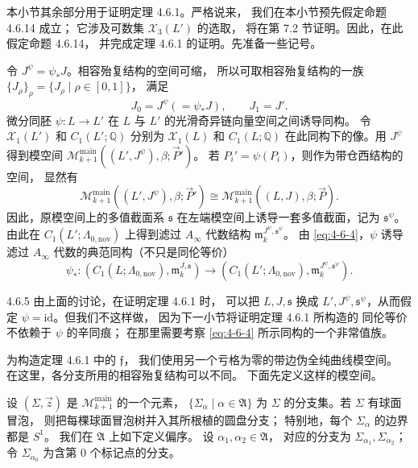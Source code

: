 本小节其余部分用于证明定理 4.6.1。严格说来，
我们在本小节预先假定命题 4.6.14 成立；
它涉及可数集 $\mathcal X_3(L')$ 的选取，
将在第 7.2 节证明。因此，在此假定命题 4.6.14，
并完成定理 4.6.1 的证明。先准备一些记号。

令 $J^\psi=\psi_*J$。相容殆复结构的空间可缩，
所以可取相容殆复结构的一族
$\{J_\rho\}_\rho=\{J_\rho\mid\rho\in[0,1]\}$，
满足
\[
 J_0=J^\psi(=\psi_*J),\qquad J_1=J'.
\]
微分同胚 $\psi\colon L\to L'$ 在 $L$ 与 $L'$
的光滑奇异链向量空间之间诱导同构。
令 $\mathcal X_1(L')$ 和 $C_1(L';\mathbb Q)$
分别为 $\mathcal X_1(L)$ 和 $C_1(L;\mathbb Q)$
在此同构下的像。用 $J^\psi$ 得到模空间
$\mathcal M_{k+1}^{\mathrm{main}}
((L',J^\psi),\beta;\vec P')$。
若 $P_i'=\psi(P_i)$，则作为带仓西结构的空间，
显然有
\begin{equation}
 \mathcal M_{k+1}^{\mathrm{main}}
 ((L',J^\psi),\beta;\vec P')
 \cong
 \mathcal M_{k+1}^{\mathrm{main}}
 ((L,J),\beta;\vec P).
\tag{4.6.4}\label{eq:4-6-4}
\end{equation}
因此，原模空间上的多值截面系 $\mathfrak s$
在左端模空间上诱导一套多值截面，记为
$\mathfrak s^\psi$。由此在
$C_1(L';\Lambda_{0,\mathrm{nov}})$
上得到滤过 $A_\infty$ 代数结构
$\mathfrak m_k^{J^\psi,\mathfrak s^\psi}$。
由 \eqref{eq:4-6-4}，$\psi$ 诱导滤过
$A_\infty$ 代数的典范同构（不只是同伦等价）
\[
 \psi_*\colon
 (C_1(L;\Lambda_{0,\mathrm{nov}}),
  \mathfrak m_k^{J,\mathfrak s})
 \longrightarrow
 (C_1(L';\Lambda_{0,\mathrm{nov}}),
  \mathfrak m_k^{J^\psi,\mathfrak s^\psi}).
\]

\begin{remark}{4.6.5}\label{rem:4-6-5}
由上面的讨论，在证明定理 4.6.1 时，
可以把 $L,J,\mathfrak s$ 换成
$L',J^\psi,\mathfrak s^\psi$，从而假定
$\psi=\mathrm{id}$。但我们不这样做，
因为下一小节将证明定理 4.6.1 所构造的
同伦等价不依赖于 $\psi$ 的辛同痕；
在那里需要考察 \eqref{eq:4-6-4}
所示同构的一个非常值族。
\end{remark}

为构造定理 4.6.1 中的 $\mathfrak f$，
我们使用另一个亏格为零的带边伪全纯曲线模空间。
在这里，各分支所用的相容殆复结构可以不同。
下面先定义这样的模空间。

设 $(\Sigma,\vec z)$ 是
$\mathcal M_{k+1}^{\mathrm{main}}$ 的一个元素，
$\{\Sigma_\alpha\mid\alpha\in\mathfrak A\}$
为 $\Sigma$ 的分支集。若 $\Sigma$ 有球面冒泡，
则把每棵球面冒泡树并入其所根植的圆盘分支；
特别地，每个 $\Sigma_\alpha$ 的边界都是 $S^1$。
我们在 $\mathfrak A$ 上如下定义偏序。
设 $\alpha_1,\alpha_2\in\mathfrak A$，
对应的分支为 $\Sigma_{\alpha_1},\Sigma_{\alpha_2}$；
令 $\Sigma_{\alpha_0}$ 为含第 $0$ 个标记点的分支。

